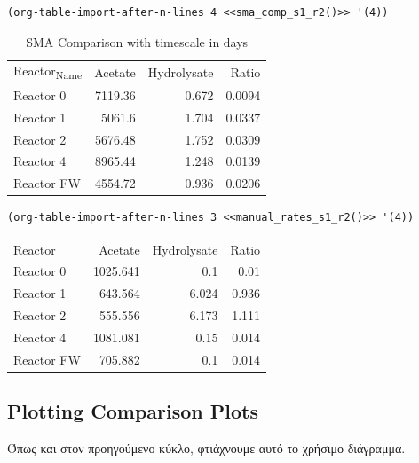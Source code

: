 \documentclass[11pt]{article}
\begin{document}
\begin{verbatim}
(org-table-import-after-n-lines 4 <<sma_comp_s1_r2()>> '(4))
\end{verbatim}

\begin{table}[htbp]
\caption{SMA Comparison with timescale in days}
\centering
\begin{tabular}{lrrr}
Reactor\textsubscript{Name} & Acetate & Hydrolysate & Ratio\\[0pt]
Reactor 0 & 7119.36 & 0.672 & 0.0094\\[0pt]
Reactor 1 & 5061.6 & 1.704 & 0.0337\\[0pt]
Reactor 2 & 5676.48 & 1.752 & 0.0309\\[0pt]
Reactor 4 & 8965.44 & 1.248 & 0.0139\\[0pt]
Reactor FW & 4554.72 & 0.936 & 0.0206\\[0pt]
\end{tabular}
\end{table}

\begin{verbatim}
(org-table-import-after-n-lines 3 <<manual_rates_s1_r2()>> '(4))
\end{verbatim}

\begin{center}
\begin{tabular}{lrrr}
Reactor & Acetate & Hydrolysate & Ratio\\[0pt]
Reactor 0 & 1025.641 & 0.1 & 0.01\\[0pt]
Reactor 1 & 643.564 & 6.024 & 0.936\\[0pt]
Reactor 2 & 555.556 & 6.173 & 1.111\\[0pt]
Reactor 4 & 1081.081 & 0.15 & 0.014\\[0pt]
Reactor FW & 705.882 & 0.1 & 0.014\\[0pt]
\end{tabular}
\end{center}

\subsection{Plotting Comparison Plots}
\label{sec:orgbd9a328}
Όπως και στον προηγούμενο κύκλο, φτιάχνουμε αυτό το χρήσιμο διάγραμμα.
\end{document}
